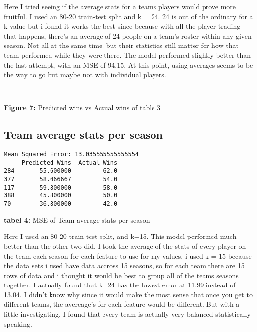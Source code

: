 \documentclass[11pt]{article}
\begin{document}
    Here I tried seeing if the average stats for a teams players would prove
more fruitful. I used an 80-20 train-test split and k = 24. 24 is out of
the ordinary for a k value but i found it works the best since because
with all the player trading that happens, there's an average of 24
people on a team's roster within any given season. Not all at the same
time, but their statistics still matter for how that team performed while they were there. The model performed slightly better than the last attempt, with an MSE of
94.15. At this point, using averages seems to be the way to go but maybe
not with individual players.

   
    \begin{center}
    \end{center}
    { \hspace*{\fill} \\}
\begin{center}
        \textbf{Figure 7:} Predicted wins vs Actual wins of table 3
    \end{center}


    \subsection{Team average stats per season}
\begin{center}
    

    \begin{Verbatim}[commandchars=\\\{\}]
Mean Squared Error: 13.035555555555554
     Predicted Wins  Actual Wins
284       55.600000         62.0
377       58.066667         54.0
117       59.800000         58.0
388       45.800000         50.0
70        36.800000         42.0
    \end{Verbatim}
\end{center}
\begin{center}
        \textbf{tabel 4:} MSE of Team average stats per season
    \end{center}
    Here I used an 80-20 train-test split, and k=15. This model performed
much better than the other two did. I took the average of the stats of
every player on the team each season for each feature to use for my
values. i used k = 15 because the data sets i used have data accross 15
seasons, so for each team there are 15 rows of data and i thought it
would be best to group all of the teams seasons together. I actually
found that k=24 has the lowest error at 11.99 instead of 13.04. I didn't
know why since it would make the most sense that once you get to
different teams, the avereage's for each feature would be different. But
with a little investigating, I found that every team is actually very
balanced statistically speaking.
\end{document}

